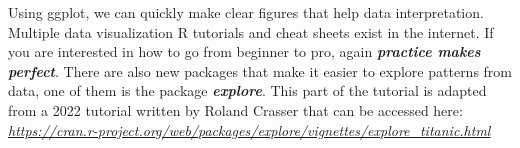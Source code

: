 \documentclass[]{article}
\newenvironment{Shaded}{\begin{snugshade}}{\end{snugshade}}
\newcommand{\CommentTok}[1]{\textcolor[rgb]{0.56,0.35,0.01}{\textit{#1}}}
\newcommand{\DataTypeTok}[1]{\textcolor[rgb]{0.13,0.29,0.53}{#1}}
\newcommand{\DecValTok}[1]{\textcolor[rgb]{0.00,0.00,0.81}{#1}}
\newcommand{\KeywordTok}[1]{\textcolor[rgb]{0.13,0.29,0.53}{\textbf{#1}}}
\newcommand{\NormalTok}[1]{#1}
\newcommand{\OperatorTok}[1]{\textcolor[rgb]{0.81,0.36,0.00}{\textbf{#1}}}
\newcommand{\OtherTok}[1]{\textcolor[rgb]{0.56,0.35,0.01}{#1}}
\newcommand{\StringTok}[1]{\textcolor[rgb]{0.31,0.60,0.02}{#1}}
\begin{document}
Using ggplot, we can quickly make clear figures that help data
interpretation. Multiple data visualization R tutorials and cheat sheets
exist in the internet. If you are interested in how to go from beginner
to pro, again \textbf{\emph{practice makes perfect}}. There are also new
packages that make it easier to explore patterns from data, one of them
is the package \textbf{\emph{explore}}. This part of the tutorial is
adapted from a 2022 tutorial written by Roland Crasser that can be
accessed here:
\emph{\url{https://cran.r-project.org/web/packages/explore/vignettes/explore_titanic.html}}

\begin{Shaded}
\end{Shaded}
\end{document}
